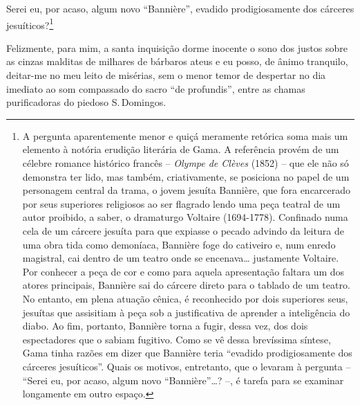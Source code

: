 Serei eu, por acaso, algum novo ``Bannière'', evadido
prodigiosamente dos cárceres jesuíticos?\footnote{A pergunta
  aparentemente menor e quiçá meramente retórica soma mais um elemento à
  notória erudição literária de Gama. A referência provém de um célebre
  romance histórico francês -- \emph{Olympe de Clèves} (1852) -- que ele
  não só demonstra ter lido, mas também, criativamente, se posiciona no
  papel de um personagem central da trama, o jovem jesuíta Bannière, que
  fora encarcerado por seus superiores religiosos ao ser flagrado lendo
  uma peça teatral de um autor proibido, a saber, o dramaturgo Voltaire
  (1694-1778). Confinado numa cela de um cárcere jesuíta para que
  expiasse o pecado advindo da leitura de uma obra tida como demoníaca,
  Bannière foge do cativeiro e, num enredo magistral, cai dentro de um
  teatro onde se encenava\ldots{} justamente Voltaire. Por conhecer a peça de
  cor e como para aquela apresentação faltara um dos atores principais,
  Bannière sai do cárcere direto para o tablado de um teatro. No
  entanto, em plena atuação cênica, é reconhecido por dois superiores
  seus, jesuítas que assisitiam à peça sob a justificativa de aprender a
  inteligência do diabo. Ao fim, portanto, Bannière torna a fugir, dessa
  vez, dos dois espectadores que o sabiam fugitivo. Como se vê dessa
  brevíssima síntese, Gama tinha razões em dizer que Bannière teria
  ``evadido prodigiosamente dos cárceres jesuíticos''. Quais os motivos,
  entretanto, que o levaram à pergunta -- ``Serei eu, por acaso, algum
  novo ``Bannière''\ldots{}? --, é tarefa para se examinar longamente em outro
  espaço.} %

Felizmente, para mim, a santa inquisição dorme inocente o sono dos
justos sobre as cinzas malditas de milhares de bárbaros ateus e eu
posso, de ânimo tranquilo, deitar-me no meu leito de misérias, sem o
menor temor de despertar no dia imediato ao som compassado do sacro ``de
profundis'', entre as chamas purificadoras do piedoso S.\,Domingos.


